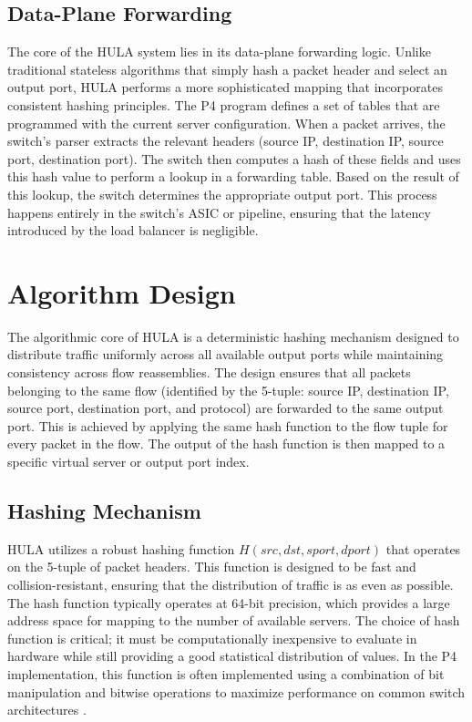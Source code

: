 \documentclass[12pt,a4paper]{article}
\begin{document}
\subsection{Data-Plane Forwarding}

The core of the HULA system lies in its data-plane forwarding logic. Unlike traditional stateless algorithms that simply hash a packet header and select an output port, HULA performs a more sophisticated mapping that incorporates consistent hashing principles. The P4 program defines a set of tables that are programmed with the current server configuration. When a packet arrives, the switch's parser extracts the relevant headers (source IP, destination IP, source port, destination port). The switch then computes a hash of these fields and uses this hash value to perform a lookup in a forwarding table. Based on the result of this lookup, the switch determines the appropriate output port. This process happens entirely in the switch's ASIC or pipeline, ensuring that the latency introduced by the load balancer is negligible.

\section{Algorithm Design}

The algorithmic core of HULA is a deterministic hashing mechanism designed to distribute traffic uniformly across all available output ports while maintaining consistency across flow reassemblies. The design ensures that all packets belonging to the same flow (identified by the 5-tuple: source IP, destination IP, source port, destination port, and protocol) are forwarded to the same output port. This is achieved by applying the same hash function to the flow tuple for every packet in the flow. The output of the hash function is then mapped to a specific virtual server or output port index.

\subsection{Hashing Mechanism}

HULA utilizes a robust hashing function $H(src, dst, sport, dport)$ that operates on the 5-tuple of packet headers. This function is designed to be fast and collision-resistant, ensuring that the distribution of traffic is as even as possible. The hash function typically operates at 64-bit precision, which provides a large address space for mapping to the number of available servers. The choice of hash function is critical; it must be computationally inexpensive to evaluate in hardware while still providing a good statistical distribution of values. In the P4 implementation, this function is often implemented using a combination of bit manipulation and bitwise operations to maximize performance on common switch architectures \cite{ref16}.
\end{document}
